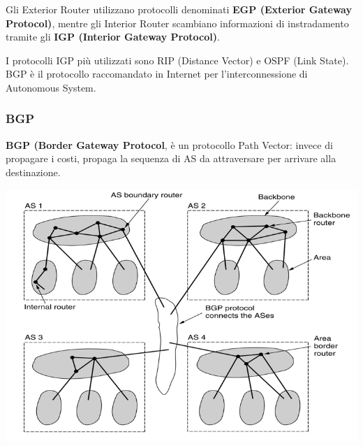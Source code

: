            Gli Exterior Router utilizzano protocolli denominati \textbf{EGP (Exterior Gateway Protocol)}, mentre gli Interior Router scambiano informazioni di instradamento tramite gli \textbf{IGP (Interior Gateway Protocol)}.
        
            I protocolli IGP più utilizzati sono RIP (Distance Vector) e OSPF (Link State). BGP è il protocollo raccomandato in Internet per l'interconnessione di Autonomous System.

        \subsubsection{BGP}
            \textbf{BGP (Border Gateway Protocol}, è un protocollo Path Vector: invece di propagare i costi, propaga la sequenza di AS da attraversare per arrivare alla destinazione.

            \begin{center}
                \includegraphics[scale=0.4]{chapters/4/assets/schema_x.png}
            \end{center}